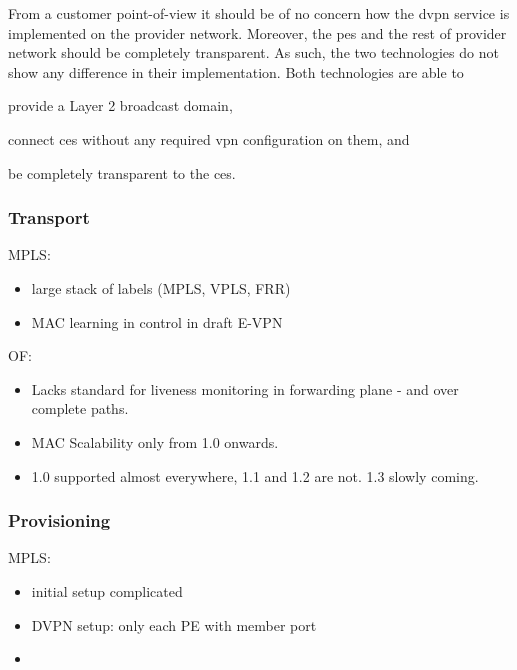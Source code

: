 From a customer point-of-view it should be of no concern how the \ac{dvpn} service is implemented on the provider network. Moreover, the \acp{pe} and the rest of provider network should be completely transparent. As such, the two technologies do not show any difference in their implementation. Both technologies are able to 
\begin{inparaenum}[\itshape 1\upshape)]
	\item provide a Layer 2 broadcast domain,
	\item connect \acp{ce} without any required \ac{vpn} configuration on them, and
	\item be completely transparent to the \acp{ce}.
\end{inparaenum}


\subsubsection{Transport} %
\label{ssub:transport}



MPLS:
\begin{itemize}
	\item large stack of labels (MPLS, VPLS, FRR)
	\item MAC learning in control in draft E-VPN
\end{itemize}

OF:
\begin{itemize}
	\item Lacks standard for liveness monitoring in forwarding plane - and over complete paths.
	\item MAC Scalability only from 1.0 onwards.
	\item 1.0 supported almost everywhere, 1.1 and 1.2 are not. 1.3 slowly coming.
\end{itemize}


\subsubsection{Provisioning} %
\label{ssub:provisioning}

MPLS:
\begin{itemize}
	\item initial setup complicated
	\item DVPN setup: only each PE with member port
	\item 
\end{itemize}

